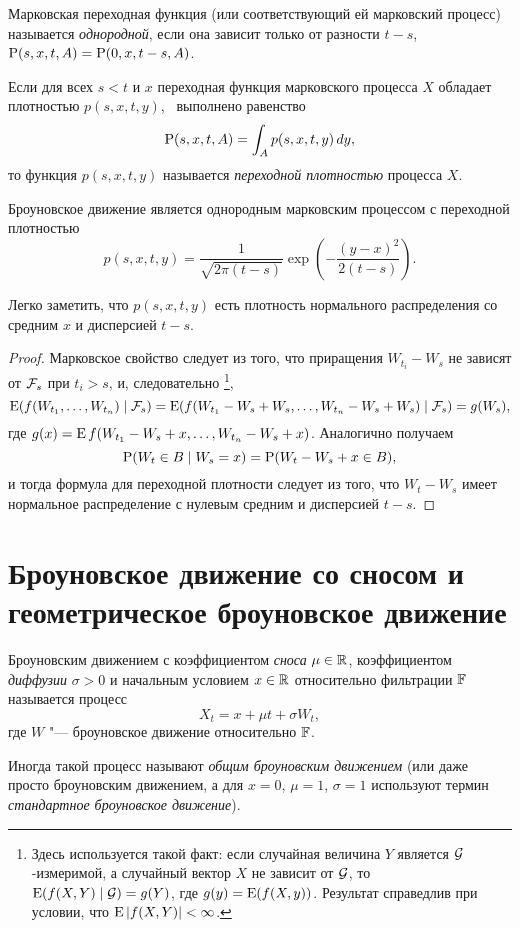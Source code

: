 \begin{definition}
Марковская переходная функция (или соответствующий ей марковский процесс) называется \emph{однородной}, если она зависит только от разности $t-s$, \te\ $\P(s,x,t,A) = \P(0,x,t-s,A)$.
\end{definition}

\begin{definition}
Если для всех $s<t$ и $x$ переходная функция марковского процесса $X$ обладает плотностью $p(s,x,t,y)$, \te\ выполнено равенство
\[
\P(s,x,t,A) = \int_A p(s,x,t,y)\,dy,
\]
то функция $p(s,x,t,y)$ называется \emph{переходной плотностью} процесса $X$.
\end{definition}

\begin{proposition}
Броуновское движение является однородным марковским процессом с переходной плотностью
\[
p(s,x,t,y) = \frac{1}{\sqrt{2\pi(t-s)}}\exp\left(-\frac{(y-x)^2}{2(t-s)}\right).
\] 
\end{proposition}
\begin{remark}
Легко заметить, что $p(s,x,t,y)$ есть плотность нормального распределения со средним $x$ и дисперсией $t-s$.
\end{remark}
\begin{proof}
Марковское свойство следует из того, что приращения $W_{t_i}-W_s$ не зависят от $\F_s$ при $t_i>s$, и, следовательно%
\footnote{Здесь используется такой факт: если случайная величина $Y$ является $\G$-измеримой, а случайный вектор $X$ не зависит от $\G$, то $\E(f(X,Y) \mid \G) = g(Y)$, где $g(y) = \E(f(X,y))$.
Результат справедлив при условии, что $\E| f(X,Y)| < \infty$.}, 
\[
\E( f(W_{t_1}, \ldots, W_{t_n}) \mid \F_s)
= \E( f(W_{t_1} - W_s + W_s, \ldots, W_{t_n} - W_s + W_s) \mid \F_s)
= g(W_s),
\]
где $g(x) = \E f(W_{t_1} - W_s + x, \ldots, W_{t_n} - W_s + x)$.
Аналогично получаем
\[
\P(W_t \in B \mid W_s = x) = \P( W_t - W_s + x \in B),
\]
и тогда формула для переходной плотности следует из того, что $W_t - W_s$ имеет нормальное распределение с нулевым средним и дисперсией $t-s$.
\end{proof}


\section{Броуновское движение со сносом и геометрическое броуновское движение}

\begin{definition}
Броуновским движением с коэффициентом \emph{сноса} $\mu\in\R$, коэффициентом \emph{диффузии} $\sigma>0$ и начальным условием $x\in\R$ относительно фильтрации $\FF$ называется процесс
\[
X_t = x + \mu t + \sigma W_t,
\]
где $W$ "--- броуновское движение относительно $\FF$.

Иногда такой процесс называют \emph{общим броуновским движением} (или даже просто броуновским движением, а для $x=0$, $\mu=1$, $\sigma=1$ используют термин \emph{стандартное броуновское движение}).
\end{definition}


